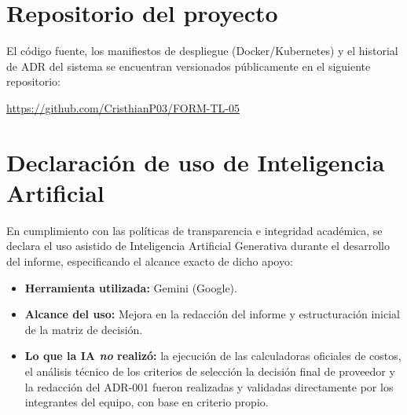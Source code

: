 \documentclass[12pt, a4paper]{article}
\begin{document}
\section{Repositorio del proyecto}

El código fuente, los manifiestos de despliegue (Docker/Kubernetes) y el historial de ADR del sistema se encuentran versionados públicamente en el siguiente repositorio:

\begin{center}
\url{https://github.com/CristhianP03/FORM-TL-05}
\end{center}

\section{Declaración de uso de Inteligencia Artificial}

En cumplimiento con las políticas de transparencia e integridad académica, se declara el uso asistido de Inteligencia Artificial Generativa durante el desarrollo del informe, especificando el alcance exacto de dicho apoyo:

\begin{itemize}
    \item \textbf{Herramienta utilizada:} Gemini (Google).
    \item \textbf{Alcance del uso:} Mejora en la redacción del informe y estructuración inicial de la matriz de decisión.
    \item \textbf{Lo que la IA \emph{no} realizó:} la ejecución de las calculadoras oficiales de costos, el análisis técnico de los criterios de selección la decisión final de proveedor y la redacción del ADR-001 fueron realizadas y validadas directamente por los integrantes del equipo, con base en criterio propio.
\end{itemize}

\newpage
\printbibliography[title={Referencias}]
\end{document}
